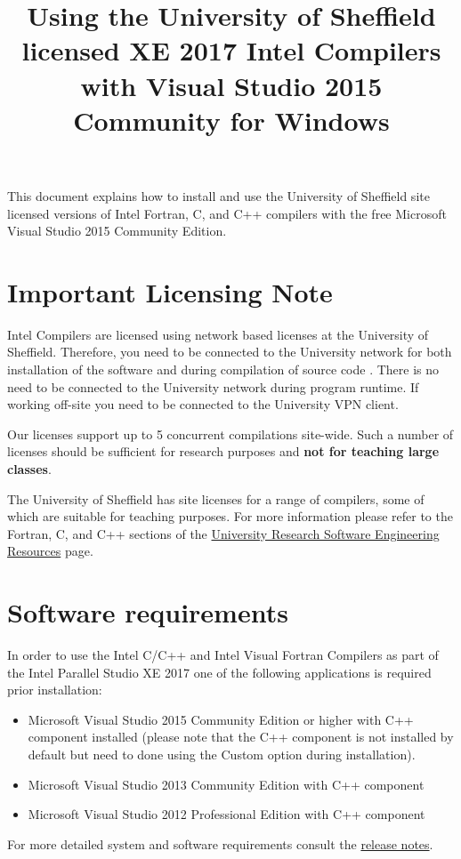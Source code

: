 \documentclass[10pt,a4paper,oneside]{article}
\title{Using the University of Sheffield licensed XE 2017 Intel Compilers with Visual Studio 2015 Community for Windows}
\date{}
\begin{document}
\maketitle
This document explains how to install and use the University of Sheffield site licensed versions of Intel Fortran, C, and C++ compilers with the free Microsoft Visual Studio 2015 Community Edition. 

\section*{Important Licensing Note}
Intel Compilers are licensed using network based licenses at the University of Sheffield. Therefore, you need to be connected to the University network for both installation of the software and during compilation of source code . There is no need to be connected to the University network during program runtime. If working off-site you need to be connected to the University VPN client.

Our licenses support up to 5 concurrent compilations site-wide. Such a number of licenses should be sufficient for research purposes and \textbf{not for teaching large classes}. 

The University of Sheffield has site licenses for a range of compilers, some of which are suitable for teaching purposes. For more information please refer to the Fortran, C, and C++ sections of the \href{http://rse.shef.ac.uk/resources/}{University Research Software Engineering Resources} page. 

\section*{Software requirements}
In order to use the Intel C/C++ and Intel Visual Fortran Compilers as part of the Intel Parallel Studio XE 2017  one of the following applications is required prior installation:
\begin{itemize}
\item Microsoft Visual Studio 2015 Community Edition or higher with C++ component installed (please note that the C++ component is not installed by default but need to done using the Custom option during installation).
\item Microsoft Visual Studio 2013 Community Edition with C++ component
\item Microsoft Visual Studio 2012 Professional Edition with C++ component
\end{itemize}
For  more detailed system and software requirements consult the \href{https://software.intel.com/en-us/articles/intel-parallel-studio-xe-release-notes}{release notes}.
\newpage
\end{document}
